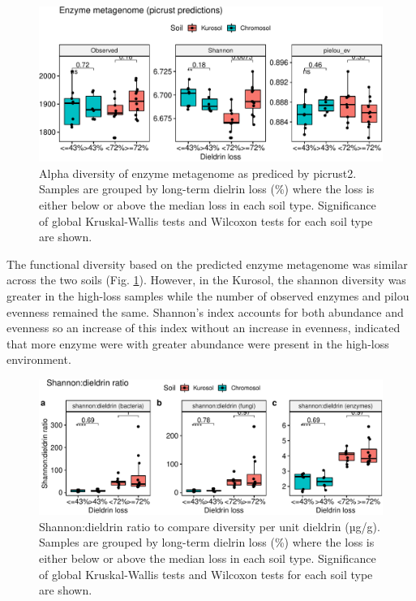 \documentclass[
]{article}
\begin{document}
\begin{figure}
\centering
\includegraphics{M2_Results_files/figure-latex/alphadlossenzymes-1.pdf}
\caption{\label{fig:alphadlossenzymes}Alpha diversity of enzyme metagenome as prediced by picrust2. Samples are grouped by long-term dielrin loss (\%) where the loss is either below or above the median loss in each soil type. Significance of global Kruskal-Wallis tests and Wilcoxon tests for each soil type are shown.}
\end{figure}

The functional diversity based on the predicted enzyme metagenome was similar across the two soils (Fig. \ref{fig:alphadlossenzymes}). However, in the Kurosol, the shannon diversity was greater in the high-loss samples while the number of observed enzymes and pilou evenness remained the same. Shannon's index accounts for both abundance and evenness so an increase of this index without an increase in evenness, indicated that more enzyme were with greater abundance were present in the high-loss environment.

\begin{figure}
\centering
\includegraphics{M2_Results_files/figure-latex/alphaperD17-1.pdf}
\caption{\label{fig:alphaperD17}Shannon:dieldrin ratio to compare diversity per unit dieldrin (µg/g). Samples are grouped by long-term dielrin loss (\%) where the loss is either below or above the median loss in each soil type. Significance of global Kruskal-Wallis tests and Wilcoxon tests for each soil type are shown.}
\end{figure}
\end{document}
